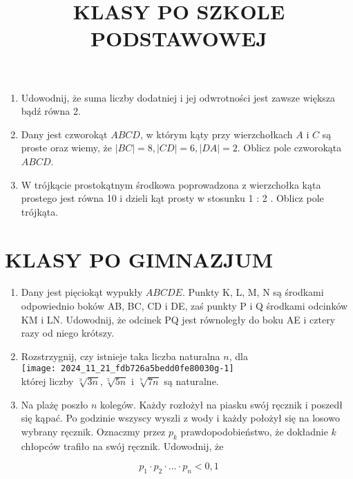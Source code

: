 \documentclass[10pt]{article}
\title{KLASY PO SZKOLE PODSTAWOWEJ }
\author{}
\date{}
\begin{document}
\maketitle
\begin{enumerate}
  \item Udowodnij, że suma liczby dodatniej i jej odwrotności jest zawsze większa bądź równa 2.
  \item Dany jest czworokąt \(A B C D\), w którym kąty przy wierzchołkach \(A\) i \(C\) są proste oraz wiemy, że \(|B C|=8,|C D|=6,|D A|=2\). Oblicz pole czworokąta \(A B C D\).
  \item W trójkącie prostokątnym środkowa poprowadzona z wierzchołka kąta prostego jest równa 10 i dzieli kąt prosty w stosunku 1 : 2 . Oblicz pole trójkąta.
\end{enumerate}

\section*{KLASY PO GIMNAZJUM}
\begin{enumerate}
  \item Dany jest pięciokąt wypukły \(A B C D E\). Punkty K, L, M, N są środkami odpowiednio boków AB, BC, CD i DE, zaś punkty P i Q środkami odcinków KM i LN. Udowodnij, że odcinek PQ jest równoległy do boku AE i cztery razy od niego krótszy.
  \item Rozstrzygnij, czy istnieje taka liczba naturalna \(n\), dla\\
\texttt{[image: 2024\_11\_21\_fdb726a5bedd0fe80030g-1]}\\
której liczby \(\sqrt[3]{3 n}, \sqrt[5]{5 n}\) i \(\sqrt[7]{7 n}\) są naturalne.
  \item Na plażę poszło \(n\) kolegów. Każdy rozłożył na piasku swój ręcznik i poszedł się kąpać. Po godzinie wszyscy wyszli z wody i każdy położył się na losowo wybrany ręcznik. Oznaczmy przez \(p_{k}\) prawdopodobieństwo, że dokładnie \(k\) chłopców trafiło na swój ręcznik. Udowodnij, że
\end{enumerate}

\[
p_{1} \cdot p_{2} \cdot \ldots \cdot p_{n}<0,1
\]
\end{document}

